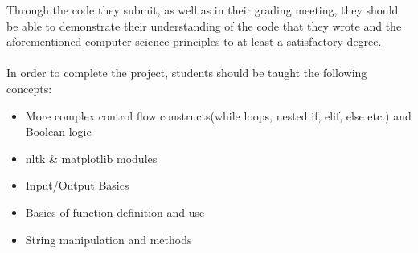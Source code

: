 \documentclass[11pt, letterpaper, onecolumn, oneside, final]{article}
\begin{document}
Through the code they submit, as well as in their grading meeting, they should be able to demonstrate their understanding of the code that they wrote and the aforementioned computer science principles to at least a satisfactory degree.\\
\\
In order to complete the project, students should be taught the following concepts:
\begin{itemize}
    \item More complex control flow constructs(while loops, nested if, elif, else etc.) and Boolean logic
    \item {\consolas nltk} \& {\consolas matplotlib} modules
    \item Input/Output Basics
    \item Basics of function definition and use
    \item String manipulation and methods
\end{itemize}
\end{document}
